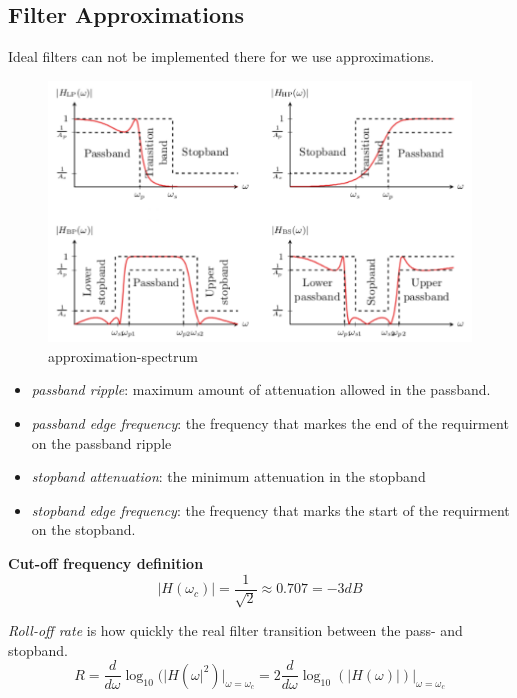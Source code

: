
\subsection{Filter Approximations}
Ideal filters can not be implemented there for we use approximations. 

\begin{figure}[!h]
    \centering
    \includegraphics[width=12cm]{image/approximation-spectrum.pdf}
    \caption{approximation-spectrum}
    \label{fig:approximation-spectrum}
\end{figure}

\begin{itemize}
    \item \textit{passband ripple}: maximum amount of attenuation allowed in the passband.
    \item \textit{passband edge frequency}: the frequency that markes the end of the requirment on the passband ripple
    \item \textit{stopband attenuation}: the minimum attenuation in the stopband
    \item \textit{stopband edge frequency}: the frequency  that marks the start of the requirment on the stopband.
\end{itemize}

\textbf{Cut-off frequency definition}
\begin{equation*}
   |H(\omega_c)| = \frac{1}{\sqrt{2}} \approx 0.707 = -3dB
\end{equation*}


\textit{Roll-off rate} is how quickly the real filter transition between the pass- and stopband.
\begin{equation*}
    R=\frac{d}{d\omega}\log_10(|H(\omega|^2)\Big|_{\omega=\omega_c} = 2\frac{d}{d\omega}\log_10(|H(\omega)|)\Big|_{\omega=\omega_c}
\end{equation*}

